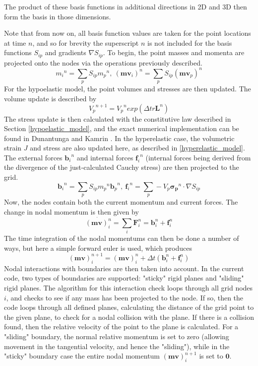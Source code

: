 The product of these basis functions in additional directions in 2D and 3D then form the basis in those dimensions.

Note that from now on, all basis function values are taken for the point locations at time $n$, and so for brevity the superscript $n$ is not included for the basis functions $S_{ip}$ and gradients $\nabla S_{ip}$. To begin, the point masses and momenta are projected onto the nodes via the operations previously described. 
\begin{equation}
{m_i}^n=\sum_pS_{ip}{m_p}^n,\ ({{\bm{mv}}_i})^n=\sum_pS_{ip}({{\bm{mv}}_p})^n\label{mass_and_mom_projection}
\end{equation}
For the hypoelastic model, the point volumes and stresses are then updated. The volume update is described by
\begin{equation}
{V_p}^{n+1}={V_p}^n exp(\Delta tr\bm{L}^n) \label{volume_update}
\end{equation}
The stress update is then calculated with the constitutive law described in Section \ref{hypoelastic_model}, and the exact numerical implementation can be found in Dunantunga and Kamrin \cite{Dunatunga:2015:Continuum}. In the hyperelastic case, the volumetric strain $J$ and stress are also updated here, as described in \ref{hyperelastic_model}.
The external forces ${\bm{b}_i}^n$ and internal forces ${\bm{f}_i}^n$ (internal forces being derived from the divergence of the just-calculated Cauchy stress) are then projected to the grid.
\begin{equation}
{\bm{b}_i}^n=\sum_pS_{ip}{m_p}^n{\bm{b}_p}^n,\ {\bm{f}_i}^n=\sum_p -V_p\bm{{\sigma}_p}^n \cdot \nabla S_{ip}
\label{force_projection}
\end{equation}
Now, the nodes contain both the current momentum and current forces. The change in nodal momentum is then given by
\begin{equation}
\dot{(\bm{mv})^n_i}=\sum_{i}\bm{F}^n_i=\bm{b}^n_i+\bm{f}^n_i\label{momentum_rate}
\end{equation}
The time integration of the nodal momentums can then be done a number of ways, but here a simple forward euler is used, which produces
\begin{equation}
(\bm{mv})^{n+1}_i=(\bm{mv})^n_i+\Delta t(\bm{b}^n_i+\bm{f}^n_i)
\end{equation}
Nodal interactions with boundaries are then taken into account. In the current code, two types of boundaries are supported: "sticky" rigid planes and "sliding" rigid planes. The algorithm for this interaction check loops through all grid nodes $i$, and checks to see if any mass has been projected to the node. If so, then the code loops through all defined planes, calculating the distance of the grid point to the given plane, to check for a nodal collision with the plane. If there is a collision found, then the relative velocity of the point to the plane is calculated. For a "sliding" boundary, the normal relative momentum is set to zero (allowing movement in the tangential velocity, and hence the "sliding"), while in the "sticky" boundary case the entire nodal momentum $(\bm{mv})^{n+1}_i$ is set to $\bm{0}$.

